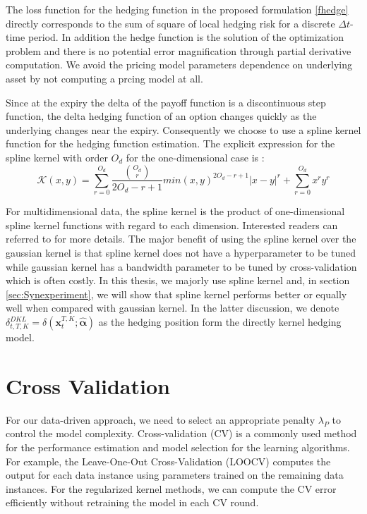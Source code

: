\documentclass[letterpaper,12pt,titlepage,oneside,final]{book}
\numberwithin{equation}{section}
\theoremstyle{definition}
\newcommand{\vx}{\mathbf{x}}
\newcommand{\DT}{\Delta t}
\newcommand{\valpha}{\pmb{\widehat{\alpha}}}
\begin{document}
The loss function for the hedging function in the proposed formulation \eqref{fhedge}
directly corresponds to the sum of square of local hedging risk for a discrete $\DT$-time period. In addition the hedge function is the solution of the optimization problem  and there is no potential error magnification through partial derivative computation. We avoid the pricing model parameters dependence on underlying asset by not computing a prcing model at all.




Since at the expiry the delta of the payoff function is a discontinuous step function, the  delta hedging function of an option changes quickly as the underlying changes near the expiry.
Consequently we choose to use a spline kernel function \citep{vapnik1998statistical} for the hedging function estimation.
The explicit expression for the spline kernel with order $O_d$  for the one-dimensional case is :
\[
\mathcal{K}(x,y)=\sum_{r=0}^{O_d} \frac{\binom{O_d}{r}}{2 O_d-r+1} min(x,y)^{2 O_d-r+1}|x-y|^r +\sum_{r=0}^{O_d} x^ry^r
\]

For multidimensional data, the spline kernel is the product of one-dimensional spline kernel functions with regard to each dimension. Interested readers can referred to \citep{vapnik1998statistical} for more details. The major benefit of using the spline kernel over the gaussian kernel  is that spline kernel does not have a hyperparameter to be tuned while  gaussian kernel has  a bandwidth parameter to be tuned by cross-validation which is often costly. In this thesis, we majorly use spline kernel and, in section 
\ref{sec:Synexperiment}, we will show that spline kernel performs better or equally well when compared with gaussian kernel.  In the latter discussion, we denote $\delta^{DKL}_{t,T,K}= \delta(\vx_{t}^{T,K};\mathbf{\valpha})$ as the hedging position form the directly kernel hedging model.


\section{Cross Validation} \label{sec:cross}
 For our data-driven approach, we need to select an appropriate penalty $\lambda_P$ to control the model complexity. Cross-validation (CV) is a commonly used method for the performance estimation and model selection for the learning algorithms. For example, the Leave-One-Out Cross-Validation (LOOCV) computes the output for each data instance using parameters trained on the remaining data instances. For the regularized kernel methods, we can compute the CV error efficiently without retraining the model in each CV round.
\end{document}
